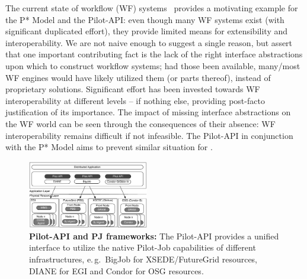 \documentclass{sig-alternate}
\begin{document}
The current state of workflow (WF) systems~\cite{nsf-workflow,1196459}
provides a motivating example for the P* Model and the Pilot-API:
even though many WF systems exist (with significant duplicated
effort), they provide limited means for extensibility and
interoperability.  We are not naive enough to suggest a single reason,
but assert that one important contributing fact is the lack of the
right interface abstractions upon which to construct workflow systems;
had those been available, many/most WF engines would have likely
utilized them (or parts thereof), instead of proprietary solutions.
%
%
Significant effort has been invested towards WF interoperability at
different levels -- if nothing else, providing post-facto
justification of its importance. The impact of missing interface
abstractions on the WF world can be seen through the consequences of
their absence: WF interoperability remains difficult if not
infeasible. The Pilot-API in conjunction with the P* Model aims to
prevent similar situation for \pilotjobs.



% 


\begin{figure}[b]
    \centering
    \up\up
    \includegraphics[width=0.47\textwidth]{figures/distributed_pilot_job.pdf}
    \caption{\textbf{Pilot-API and PJ frameworks:} The Pilot-API provides 
      a unified interface to utilize the native Pilot-Job capabilities of
      different infrastructures, e.\,g.\ BigJob for XSEDE/FutureGrid
      resources, DIANE for EGI and Condor for OSG resources.
  }
    \label{fig:figures_distributed_pilot_job}
\end{figure}
\end{document}
